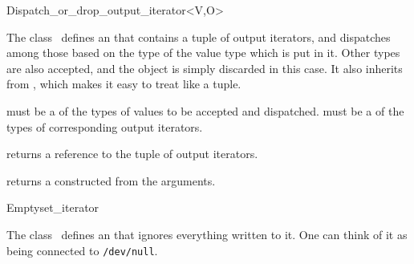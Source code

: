 \begin{ccRefClass}{Dispatch_or_drop_output_iterator<V,O>}


  \ccDefinition The class \ccClassTemplateName\ defines an
   that contains a tuple of output iterators, and dispatches
  among those based on the type of the value type which is put in it.
  Other types are also accepted, and the object is simply discarded in this case.
  It also inherits from , which makes it easy to treat like a tuple.

  \ccParameters
   must be a  of the types of values to be accepted and dispatched.
   must be a  of the types of corresponding output iterators.


  \ccIsModel

  \ccInheritsFrom {}

  \ccTypes

  \ccGlue

  \ccCreation



  {returns a reference to the tuple of output iterators.}

  {returns a  constructed from the arguments.}

  \ccSeeAlso

\end{ccRefClass}


\begin{ccRefClass}{Emptyset_iterator}
  \label{sectionEmptysetIterator}

  
  \ccDefinition The class \ccClassName\ defines an
   that ignores everything written to it. One can
  think of it as being connected to \texttt{/dev/null}.


  \ccIsModel
  
  \ccCreation

  
  
  \ccSeeAlso
  \\

\end{ccRefClass}

